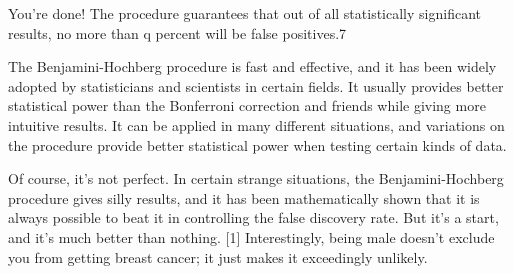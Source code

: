 You’re done! The procedure guarantees that out of all statistically significant results, no more than q percent will be false positives.7

The Benjamini-Hochberg procedure is fast and effective, and it has been widely adopted by statisticians and scientists in certain fields. It usually provides better statistical power than the Bonferroni correction and friends while giving more intuitive results. It can be applied in many different situations, and variations on the procedure provide better statistical power when testing certain kinds of data.

Of course, it’s not perfect. In certain strange situations, the Benjamini-Hochberg procedure gives silly results, and it has been mathematically shown that it is always possible to beat it in controlling the false discovery rate. But it’s a start, and it’s much better than nothing.
[1]	Interestingly, being male doesn’t exclude you from getting breast cancer; it just makes it exceedingly unlikely.
